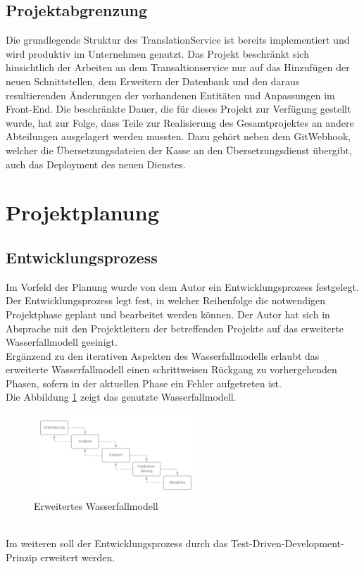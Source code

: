 \documentclass[10pt, oneside, ngerman]{article}
\begin{document}
  \subsection{Projektabgrenzung}
    Die grundlegende Struktur des TranslationService ist bereits implementiert und wird produktiv im Unternehmen genutzt. Das Projekt beschränkt sich hinsichtlich der Arbeiten an dem Transaltionservice nur auf das Hinzufügen der 
    neuen Schnittstellen, dem Erweitern der Datenbank und den daraus resultierenden Änderungen der vorhandenen Entitäten und Anpassungen im Front-End.
    Die beschränkte Dauer, die für dieses Projekt zur Verfügung gestellt wurde, hat zur Folge, dass Teile zur Realisierung des Gesamtprojektes an andere Abteilungen ausgelagert werden mussten.
    Dazu gehört neben dem GitWebhook, welcher die Übersetzungsdateien der Kasse an den Übersetzungsdienst übergibt, auch das Deployment des neuen Dienstes.
  \section{Projektplanung}
  \subsection{Entwicklungsprozess}\label{sec:dev:prc}
    Im Vorfeld der Planung wurde von dem Autor ein Entwicklungsprozess festgelegt. Der Entwicklungsprozess legt fest, in welcher Reihenfolge 
    die notwendigen Projektphase geplant und bearbeitet werden können.
    Der Autor hat sich in Absprache mit den Projektleitern der betreffenden Projekte auf das erweiterte Wasserfallmodell geeinigt.\\
    Ergänzend zu den iterativen Aspekten des Wasserfallmodells erlaubt das erweiterte Wasserfallmodell einen schrittweisen Rückgang zu vorhergehenden Phasen,
    sofern in der aktuellen Phase ein Fehler aufgetreten ist.\\
    Die Abbildung \ref{abb:vg} zeigt das genutzte Wasserfallmodell. 
    \begin{figure}[ht]
      \centering
      \includegraphics[width=0.55\textwidth]{Wasserfallmodell.png}
      \caption{Erweitertes Wasserfallmodell}
      \label{abb:vg}
    \end{figure}
    \\
    Im weiteren soll der Entwicklungsprozess durch das Test-Driven-Development-Prinzip erweitert werden.
    \newpage
\end{document}
